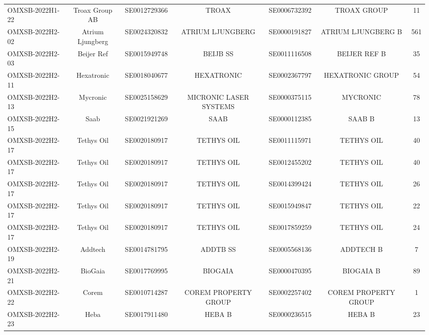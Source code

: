 \begin{threeparttable}
\begin{tabular}{@{}lcccccc}
\addlinespace[0.25ex]
\addlinespace[0.25ex]
OMXSB-2022H1-22 & Troax Group AB & SE0012729366 & TROAX & SE0006732392 & TROAX GROUP & 11 \\
\addlinespace[0.25ex]
\addlinespace[0.25ex]
OMXSB-2022H2-02 & Atrium Ljungberg & SE0024320832 & ATRIUM LJUNGBERG & SE0000191827 & ATRIUM LJUNGBERG B & 561 \\
\addlinespace[0.25ex]
\addlinespace[0.25ex]
OMXSB-2022H2-03 & Beijer Ref & SE0015949748 & BEIJB SS & SE0011116508 & BEIJER REF B & 35 \\
\addlinespace[0.25ex]
\addlinespace[0.25ex]
OMXSB-2022H2-11 & Hexatronic & SE0018040677 & HEXATRONIC & SE0002367797 & HEXATRONIC GROUP & 54 \\
\addlinespace[0.25ex]
\addlinespace[0.25ex]
OMXSB-2022H2-13 & Mycronic & SE0025158629 & MICRONIC LASER SYSTEMS & SE0000375115 & MYCRONIC & 78 \\
\addlinespace[0.25ex]
\addlinespace[0.25ex]
OMXSB-2022H2-15 & Saab & SE0021921269 & SAAB & SE0000112385 & SAAB B & 13 \\
\addlinespace[0.25ex]
\addlinespace[0.25ex]
OMXSB-2022H2-17 & Tethys Oil & SE0020180917 & TETHYS OIL & SE0011115971 & TETHYS OIL & 40 \\
\addlinespace[0.25ex]
\addlinespace[0.25ex]
OMXSB-2022H2-17 & Tethys Oil & SE0020180917 & TETHYS OIL & SE0012455202 & TETHYS OIL & 40 \\
\addlinespace[0.25ex]
\addlinespace[0.25ex]
OMXSB-2022H2-17 & Tethys Oil & SE0020180917 & TETHYS OIL & SE0014399424 & TETHYS OIL & 26 \\
\addlinespace[0.25ex]
\addlinespace[0.25ex]
OMXSB-2022H2-17 & Tethys Oil & SE0020180917 & TETHYS OIL & SE0015949847 & TETHYS OIL & 22 \\
\addlinespace[0.25ex]
\addlinespace[0.25ex]
OMXSB-2022H2-17 & Tethys Oil & SE0020180917 & TETHYS OIL & SE0017859259 & TETHYS OIL & 24 \\
\addlinespace[0.25ex]
\addlinespace[0.25ex]
OMXSB-2022H2-19 & Addtech & SE0014781795 & ADDTB SS & SE0005568136 & ADDTECH B & 7 \\
\addlinespace[0.25ex]
\addlinespace[0.25ex]
OMXSB-2022H2-21 & BioGaia & SE0017769995 & BIOGAIA & SE0000470395 & BIOGAIA B & 89 \\
\addlinespace[0.25ex]
\addlinespace[0.25ex]
OMXSB-2022H2-22 & Corem & SE0010714287 & COREM PROPERTY GROUP & SE0002257402 & COREM PROPERTY GROUP & 1 \\
\addlinespace[0.25ex]
\addlinespace[0.25ex]
OMXSB-2022H2-23 & Heba & SE0017911480 & HEBA B & SE0000236515 & HEBA B & 23 \\

\end{tabular}
\end{threeparttable}
